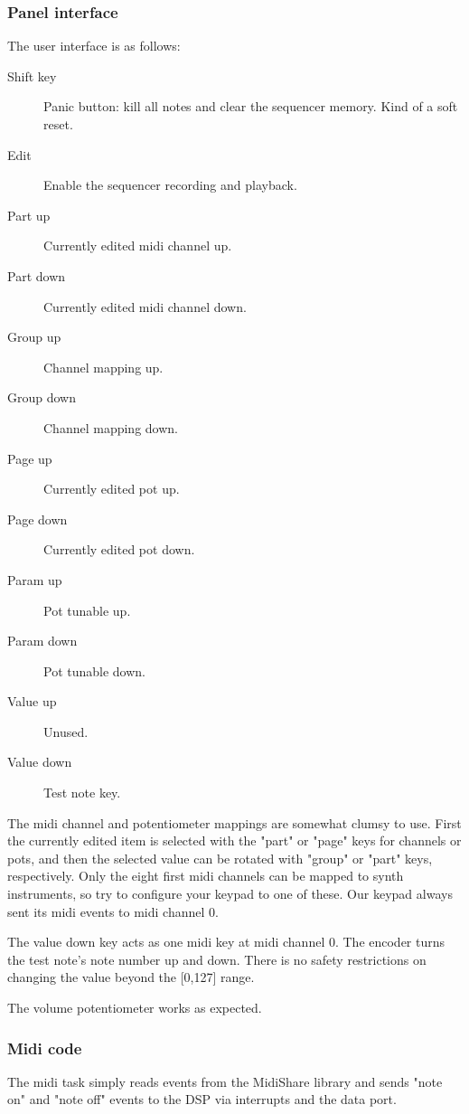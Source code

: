 \documentclass[10pt,a4paper,oneside]{article}
\begin{document}
\subsubsection{Panel interface}

The user interface is as follows:

\begin{description}
	\item[Shift key] Panic button: kill all notes and clear the sequencer memory. Kind of a soft reset.
	\item[Edit] Enable the sequencer recording and playback.
	\item[Part up] Currently edited midi channel up.
	\item[Part down] Currently edited midi channel down.
	\item[Group up] Channel mapping up.
	\item[Group down] Channel mapping down.
	\item[Page up] Currently edited pot up.
	\item[Page down] Currently edited pot down.
	\item[Param up] Pot tunable up.
	\item[Param down] Pot tunable down.
	\item[Value up] Unused.
	\item[Value down] Test note key.
\end{description}

The midi channel and potentiometer mappings are somewhat clumsy to use. First the currently edited item is selected with the "part" or "page" keys for channels or pots, and then the selected value can be rotated with "group" or "part" keys, respectively. Only the eight first midi channels can be mapped to synth instruments, so try to configure your keypad to one of these. Our keypad always sent its midi events to midi channel 0.

The value down key acts as one midi key at midi channel 0. The encoder turns the test note's note number up and down. There is no safety restrictions on changing the value beyond the [0,127] range.

The volume potentiometer works as expected.

\subsubsection{Midi code}

The midi task simply reads events from the MidiShare library and sends "note on" and "note off" events to the DSP via interrupts and the data port.
\end{document}
